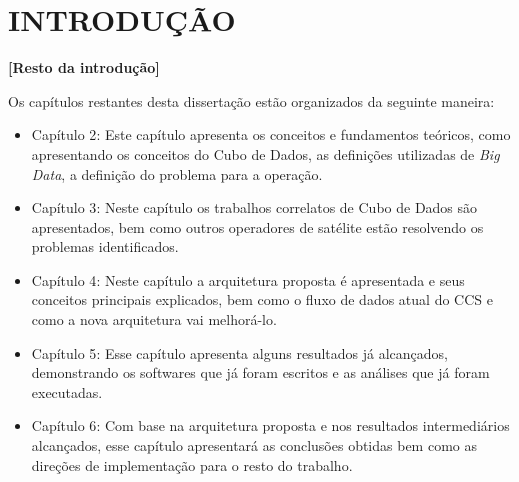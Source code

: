 
\chapter{INTRODUÇÃO}

\textbf{[Resto da introdução]}

Os capítulos restantes desta dissertação estão organizados da seguinte maneira:
\begin{itemize}
	\item{Capítulo 2}: Este capítulo apresenta os conceitos e fundamentos teóricos, como apresentando os conceitos do Cubo de Dados, as definições utilizadas de \textit{Big Data}, a definição do problema para a operação.
	\item{Capítulo 3}: Neste capítulo os trabalhos correlatos de Cubo de Dados são apresentados, bem como outros operadores de satélite estão resolvendo os problemas identificados.
	\item{Capítulo 4}: Neste capítulo a arquitetura proposta é apresentada e seus conceitos principais explicados, bem como o fluxo de dados atual do CCS e como a nova arquitetura vai melhorá-lo.
	\item{Capítulo 5}: Esse capítulo apresenta alguns resultados já alcançados, demonstrando os softwares que já foram escritos e as análises que já foram executadas.
	\item{Capítulo 6}: Com base na arquitetura proposta e nos resultados intermediários alcançados, esse capítulo apresentará as conclusões obtidas bem como as direções de implementação para o resto do trabalho.
\end{itemize}

